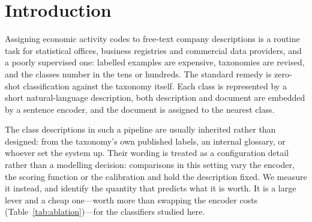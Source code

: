 \documentclass[11pt]{article}
\begin{document}
\section{Introduction}

Assigning economic activity codes to free-text company descriptions is a
routine task for statistical offices, business registries and commercial data
providers, and a poorly supervised one: labelled examples are expensive,
taxonomies are revised, and the classes number in the tens or hundreds. The
standard remedy is zero-shot classification against the taxonomy itself. Each
class is represented by a short natural-language description, both description
and document are embedded by a sentence encoder, and the document is assigned to
the nearest class.

The class descriptions in such a pipeline are usually inherited rather than
designed: from the taxonomy's own published labels, an internal glossary, or
whoever set the system up. Their wording is treated as a configuration detail
rather than a modelling decision: comparisons in this setting vary the encoder,
the scoring function or the calibration and hold the description fixed. We
measure it instead, and identify the quantity that predicts what it is worth. It
is a large lever and a cheap one---worth more than swapping the encoder costs
(Table~\ref{tab:ablation})---for the classifiers studied here.
\end{document}
